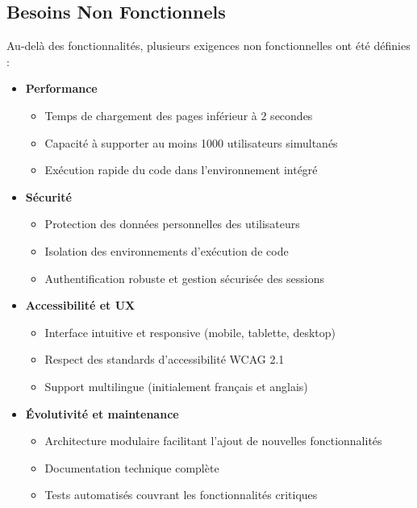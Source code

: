 \subsection{Besoins Non Fonctionnels}
Au-delà des fonctionnalités, plusieurs exigences non fonctionnelles ont été définies :

\begin{itemize}
  \item \textbf{Performance}
    \begin{itemize}
      \item Temps de chargement des pages inférieur à 2 secondes
      \item Capacité à supporter au moins 1000 utilisateurs simultanés
      \item Exécution rapide du code dans l'environnement intégré
    \end{itemize}
  
  \item \textbf{Sécurité}
    \begin{itemize}
      \item Protection des données personnelles des utilisateurs
      \item Isolation des environnements d'exécution de code
      \item Authentification robuste et gestion sécurisée des sessions
    \end{itemize}
  
  \item \textbf{Accessibilité et UX}
    \begin{itemize}
      \item Interface intuitive et responsive (mobile, tablette, desktop)
      \item Respect des standards d'accessibilité WCAG 2.1
      \item Support multilingue (initialement français et anglais)
    \end{itemize}
  
  \item \textbf{Évolutivité et maintenance}
    \begin{itemize}
      \item Architecture modulaire facilitant l'ajout de nouvelles fonctionnalités
      \item Documentation technique complète
      \item Tests automatisés couvrant les fonctionnalités critiques
    \end{itemize}
\end{itemize}

